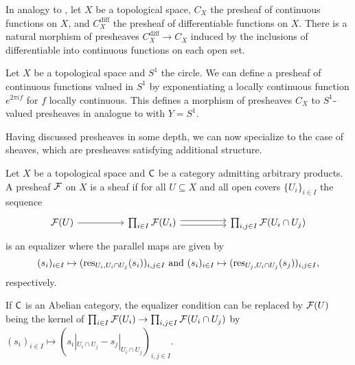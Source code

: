 \begin{example}\label{ex: inclusion of differentiable to continuous functions}
    In analogy to , let $X$ be a topological space, $C_{X}$ the presheaf of continuous functions on $X$, and $C^{\mathrm{diff}}_{X}$ the presheaf of differentiable functions on $X$. There is a natural morphism of presheaves $C_{X}^{\mathrm{diff}}\to C_{X}$ induced by the inclusions of differentiable into continuous functions on each open set. 
\end{example}
\begin{example}\label{ex: circle valued presheaves}
    Let $X$ be a topological space and $S^{1}$ the circle. We can define a presheaf of continuous functions valued in $S^{1}$ by exponentiating a locally continuous function $e^{2\pi i f}$ for $f$ locally continuous. This defines a morphism of presheaves $C_{X}$ to $S^{1}$-valued presheaves in analogue to  with $Y=S^{1}$. 
\end{example}
Having discussed presheaves in some depth, we can now specialize to the case of sheaves, which are presheaves satisfying additional structure. 
\begin{definition}[Sheaves]\label{def: sheaves}
    Let $X$ be a topological space and $\mathsf{C}$ be a category admitting arbitrary products. A presheaf $\mathcal{F}$ on $X$ is a sheaf if for all $U\subseteq X$ and all open covers $\{U_{i}\}_{i\in I}$ the sequence 
    $$%
    \begin{tikzcd}
        {\Fcal(U)} && {\prod_{i\in I}\Fcal(U_{i})} && {\prod_{i,j\in I}\Fcal(U_{i}\cap U_{j})}
        \arrow[from=1-1, to=1-3]
        \arrow[shift left, from=1-3, to=1-5]
        \arrow[shift right, from=1-3, to=1-5]
    \end{tikzcd}$$
    is an equalizer where the parallel maps are given by 
    $$(s_{i})_{i\in I}\mapsto (\mathrm{res}_{U_{i}, U_{i}\cap U_{j}}(s_{i}))_{i,j\in I}\text{ and }(s_{i})_{i\in I}\mapsto (\mathrm{res}_{U_{j}, U_{i}\cap U_{j}}(s_{j}))_{i,j\in I},$$
    respectively.
\end{definition}
\begin{remark}\label{rmk: sheaves valued in abelian categories}
    If $\mathsf{C}$ is an Abelian category, the equalizer condition can be replaced by $\mathcal{F}(U)$ being the kernel of $\prod_{i\in I}\mathcal{F}(U_{i})\to\prod_{i,j\in I}\mathcal{F}(U_{i}\cap U_{j})$ by $(s_{i})_{i\in I}\mapsto (s_{i}|_{U_{i}\cap U_{j}}-s_{j}|_{U_{i}\cap U_{j}})_{i,j\in I}$. 
\end{remark}
